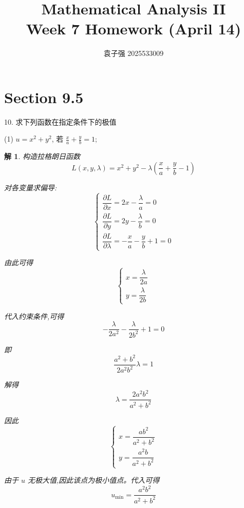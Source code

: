 \documentclass[a4paper,12pt]{article}
\title{Mathematical Analysis II\\Week 7 Homework (April 14)}
\author{袁子强\hspace{1cm} 2025533009}
\newtheorem*{sol}{解}
\begin{document}
\maketitle

\section*{Section 9.5}

10. 求下列函数在指定条件下的极值

(1) $u = x^2 + y^2$, 若 $\frac{x}{a} + \frac{y}{b} = 1$;
\begin{sol}
    构造拉格朗日函数
    $$L(x,y,\lambda)=x^2+y^2-\lambda\left(\frac{x}{a}+\frac{y}{b}-1\right)$$

    对各变量求偏导:
    $$\begin{cases}
            \dfrac{\partial L}{\partial x}=2x-\dfrac{\lambda}{a}=0 \\[8pt]
            \dfrac{\partial L}{\partial y}=2y-\dfrac{\lambda}{b}=0 \\[8pt]
            \dfrac{\partial L}{\partial \lambda}=-\dfrac{x}{a}-\dfrac{y}{b}+1=0
        \end{cases}$$

    由此可得
    $$\begin{cases}
            x=\dfrac{\lambda}{2a} \\[8pt]
            y=\dfrac{\lambda}{2b}
        \end{cases}$$

    代入约束条件,可得
    $$-\dfrac{\lambda}{2a^2}-\dfrac{\lambda}{2b^2}+1=0$$

    即
    $$\dfrac{a^2+b^2}{2a^2b^2}\lambda=1$$

    解得
    $$\lambda=\dfrac{2a^2b^2}{a^2+b^2}$$

    因此
    $$\begin{cases}
            x=\dfrac{ab^2}{a^2+b^2} \\[8pt]
            y=\dfrac{a^2b}{a^2+b^2}
        \end{cases}$$

    由于 $u$ 无极大值,因此该点为极小值点。代入可得
    $$u_{\min}=\dfrac{a^2b^2}{a^2+b^2}$$
\end{sol}
\end{document}
